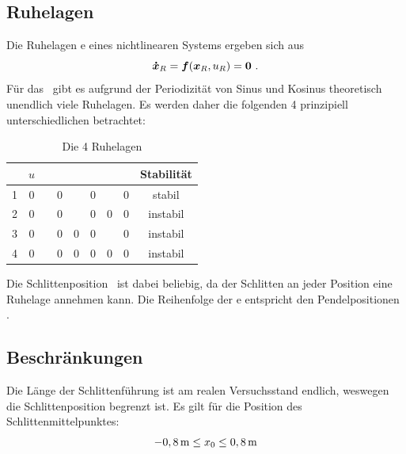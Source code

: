 \subsection{Ruhelagen}\label{sec:aps}

Die Ruhelagen \bzw \ap e eines nichtlinearen Systems ergeben sich aus
	\[
	\vexp_R = \ve{f}(\vex_R,u_R) = \ve{0}  \ .
\]
Für das \spds\ gibt es aufgrund der Periodizität von Sinus und Kosinus theoretisch unendlich viele Ruhelagen. 
Es werden daher die folgenden 4 prinzipiell unterschiedlichen betrachtet:
\begin{table}[h]
	\centering
	\caption{Die 4 Ruhelagen}
		\begin{tabular}{ccccccccc}
		\toprule
			\ap  & $u$ & \xo & \xop & \phe & \phep & \phz & \phzp & Stabilität  \\
			\midrule
			1	&	0 &	\xor	&	0	&	\pii	&	0	&	\pii	&	0	& stabil  \\
			2	&	0 &	\xor	&	0	&	\pii	&	0	&	0			&	0	& instabil  \\
			3	&	0 &	\xor	&	0	&	0			&	0	&	\pii	&	0	& instabil  \\
			4	&	0 &	\xor	&	0	&	0			&	0	&	0			&	0	& instabil  \\
			\bottomrule
		\end{tabular}
	\label{tab:aps}
\end{table}

Die Schlittenposition \xo\ ist dabei beliebig, da der Schlitten an jeder Position eine Ruhelage annehmen kann.
Die Reihenfolge der \ap e entspricht den Pendelpositionen .


\subsection{Beschränkungen}\label{sec:schlbes}

Die Länge der Schlittenführung ist am realen Versuchsstand endlich, weswegen die Schlittenposition begrenzt ist.
Es gilt für die Position des Schlittenmittelpunktes:
	\[ 
	 -0,8\,\mathrm{m} \leq x_0 \leq 0,8\,\mathrm{m}
\]